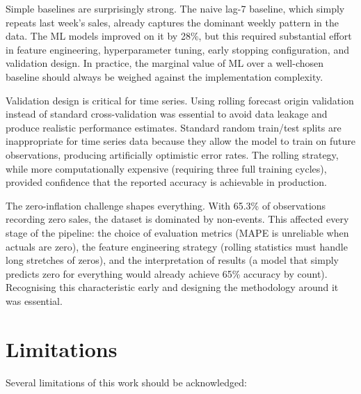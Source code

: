 Simple baselines are surprisingly strong. The naive lag-7 baseline, which simply repeats last week's sales, already captures the dominant weekly pattern in the data. The ML models improved on it by 28\%, but this required substantial effort in feature engineering, hyperparameter tuning, early stopping configuration, and validation design. In practice, the marginal value of ML over a well-chosen baseline should always be weighed against the implementation complexity.

Validation design is critical for time series. Using rolling forecast origin validation instead of standard cross-validation was essential to avoid data leakage and produce realistic performance estimates. Standard random train/test splits are inappropriate for time series data because they allow the model to train on future observations, producing artificially optimistic error rates. The rolling strategy, while more computationally expensive (requiring three full training cycles), provided confidence that the reported accuracy is achievable in production.

The zero-inflation challenge shapes everything. With 65.3\% of observations recording zero sales, the dataset is dominated by non-events. This affected every stage of the pipeline: the choice of evaluation metrics (MAPE is unreliable when actuals are zero), the feature engineering strategy (rolling statistics must handle long stretches of zeros), and the interpretation of results (a model that simply predicts zero for everything would already achieve 65\% accuracy by count). Recognising this characteristic early and designing the methodology around it was essential.

\section{Limitations}

Several limitations of this work should be acknowledged:

